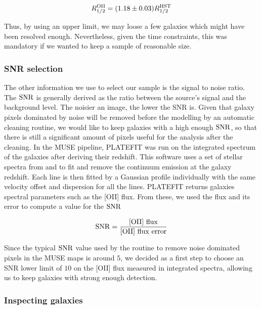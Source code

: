 \begin{equation}
	R_{1/2}^{\rm{OII}} = (1.18 \pm 0.03) R_{1/2}^{\rm{HST}}
\end{equation}

Thus, by using an upper limit, we may loose a few galaxies which might have been resolved enough. Nevertheless, given the time constraints, this was mandatory if we wanted to keep a sample of reasonable size.



\subsubsection{SNR selection}
\label{sec:cut_SNR}

The other information we use to select our sample is the signal to noise ratio. The $\rm{SNR}$ is generally derived as the ratio between the source's signal and the background level. The noisier an image, the lower the SNR is. Given that galaxy pixels dominated by noise will be removed before the modelling by an automatic cleaning routine, we would like to keep galaxies with a high enough $\rm{SNR}$, so that there is still a significant amount of pixels useful for the analysis after the cleaning. In the MUSE pipeline, \textsc{PLATEFIT}  was run on the integrated spectrum of the galaxies after deriving their redshift. This software uses a set of stellar spectra from  and  to fit and remove the continuum emission at the galaxy redshift. Each line is then fitted by a Gaussian profile individually with the same velocity offset and dispersion for all the lines. \textsc{PLATEFIT} returns galaxies spectral parameters such as the [OII] flux. From these, we used the flux and its error to compute a value for the $\rm{SNR}$

\begin{equation}
	\rm{SNR} = \frac{\rm{[OII] \,\, flux}}{\rm{[OII] \,\, flux \,\, error}}
\end{equation}

Since the typical $\rm{SNR}$ value used by the routine to remove noise dominated pixels in the MUSE maps is around $5$, we decided as a first step to choose an SNR lower limit of $10$ on the [OII] flux measured in integrated spectra, allowing us to keep galaxies with strong enough detection.


\subsubsection{Inspecting galaxies}
\label{sec:selecting_galaxies}

